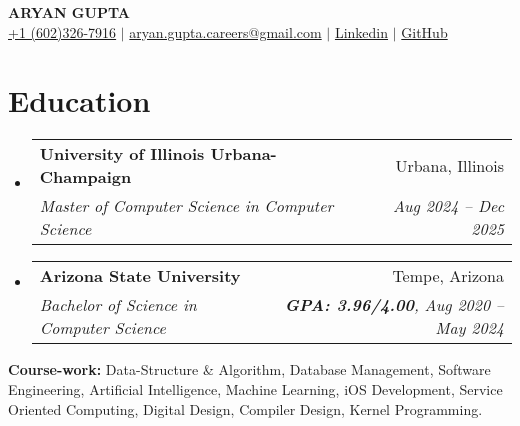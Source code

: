 \documentclass[letterpaper,11pt]{article}
\makeatletter
\newcommand{\resumeEducationHeading}[5]{
  \vspace{-2pt}\item
    \begin{tabular*}{0.97\textwidth}[t]{l@{\extracolsep{\fill}}r}
      \textbf{#1} & #2 \\
      \textit{\small#3} & \textit{\small #4#5} \\
    \end{tabular*}\vspace{-5pt}
}
\newcommand{\resumeSubHeadingListStart}{\begin{itemize}[leftmargin=0.15in, label={}]}
\newcommand{\resumeSubHeadingListEnd}{\end{itemize}}
\makeatother
\begin{document}
\begin{center}
  \textbf{\Huge \scshape ARYAN GUPTA} \\ \vspace{3pt} 
  \small
  \faMobile \hspace{.5pt} \href{tel:6023267916}{+1 (602)326-7916}
  $|$
  \faAt \hspace{.5pt} \href{mailto:aryan.gupta.careers@gmail.com}{aryan.gupta.careers@gmail.com}
  $|$
  \faLinkedinSquare \hspace{.5pt} \href{https://www.linkedin.com/in/agupt295}{{\color{blue}Linkedin}}
  $|$
  \faGithub \hspace{.5pt} \href{https://github.com/agupt295}{{\color{blue}GitHub}}
\end{center}

\section{\color[rgb]{0.25, 0.41, 0.88} Education}
\resumeSubHeadingListStart
  \resumeEducationHeading
    {University of Illinois Urbana-Champaign}{Urbana, Illinois}
    {Master of Computer Science in Computer Science}{Aug 2024 -- Dec 2025}{}{}
\resumeSubHeadingListEnd
\vspace{-0.35cm} %
\resumeSubHeadingListStart
  \resumeEducationHeading
    {Arizona State University}{Tempe, Arizona}
    {Bachelor of Science in Computer Science}{\textbf{GPA: 3.96/4.00}}{, Aug 2020 -- May 2024}{}
\resumeSubHeadingListEnd

  \resumeSubHeadingListStart
    \small{\item{
        \textbf{Course-work:}{ Data-Structure \& Algorithm, Database Management, Software Engineering, Artificial Intelligence, Machine Learning, iOS Development, Service Oriented Computing, Digital Design, Compiler Design, Kernel Programming.} \\ \vspace{3pt}
    }}
  \resumeSubHeadingListEnd

\end{document}
